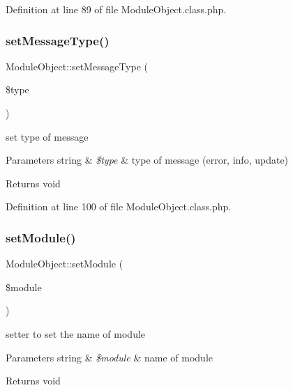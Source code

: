 Definition at line 89 of file Module\+Object.\+class.\+php.

\hypertarget{classModuleObject_a9f65f760815bb7c6667a2e521578af10}{}\label{classModuleObject_a9f65f760815bb7c6667a2e521578af10} 
\subsubsection{\texorpdfstring{set\+Message\+Type()}{setMessageType()}}
{\footnotesize\ttfamily Module\+Object\+::set\+Message\+Type (\begin{DoxyParamCaption}\item[{}]{\$type }\end{DoxyParamCaption})}

set type of message 
\begin{DoxyParams}[1]{Parameters}
string & {\em \$type} & type of message (error, info, update) \\
\hline
\end{DoxyParams}
\begin{DoxyReturn}{Returns}
void 
\end{DoxyReturn}


Definition at line 100 of file Module\+Object.\+class.\+php.

\hypertarget{classModuleObject_a610f40078a4c8590452eaedf794350ed}{}\label{classModuleObject_a610f40078a4c8590452eaedf794350ed} 
\subsubsection{\texorpdfstring{set\+Module()}{setModule()}}
{\footnotesize\ttfamily Module\+Object\+::set\+Module (\begin{DoxyParamCaption}\item[{}]{\$module }\end{DoxyParamCaption})}

setter to set the name of module 
\begin{DoxyParams}[1]{Parameters}
string & {\em \$module} & name of module \\
\hline
\end{DoxyParams}
\begin{DoxyReturn}{Returns}
void 
\end{DoxyReturn}


